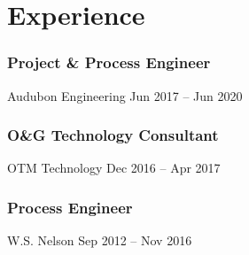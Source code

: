 %
%
\section{Experience}
  \subsubsection{Project \& Process Engineer}
  \position%
    {Audubon Engineering}%
    {Jun 2017 -- Jun 2020}%
    \Location
%
%
  {\vspace{-1em}}
%
%
  \subsubsection{O\&G Technology Consultant}
  \position%
    {OTM Technology}%
    {Dec 2016 -- Apr 2017}%
    \Location
%
%
  {\vspace{-1em}}
%
%
  \subsubsection{Process Engineer}
  \position%
    {W.S. Nelson}%
    {Sep 2012 -- Nov 2016}%
    \Location
%
%
%
